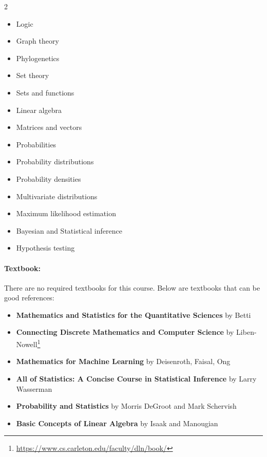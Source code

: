 \documentclass[12pt]{scrartcl}
\begin{document}
\begin{multicols}{2}
\begin{itemize}
\item Logic
\item Graph theory %
\item Phylogenetics %
\item Set theory %
\item Sets and functions
\item Linear algebra
\item Matrices and vectors
\item Probabilities
\item Probability distributions 
\item Probability densities
\item Multivariate distributions
\item Maximum likelihood estimation
\item Bayesian and Statistical inference
\item Hypothesis testing
\end{itemize}
\end{multicols}
\fi

\paragraph{Textbook:} 
There are no required textbooks for this course. Below are textbooks that can be good references: 
\begin{itemize}

\item \textbf{Mathematics and Statistics for the Quantitative Sciences} by Betti
\item \textbf{Connecting Discrete Mathematics and Computer Science} by Liben-Nowell\footnote{\url{https://www.cs.carleton.edu/faculty/dln/book/}}
\item \textbf{Mathematics for Machine Learning} by Deisenroth, Faisal, Ong
\item \textbf{All of Statistics: A Concise Course in Statistical Inference} by Larry Wasserman 
\item \textbf{Probability and Statistics} by Morris DeGroot and Mark Schervish
\item \textbf{Basic Concepts of Linear Algebra} by Isaak and Manougian
\end{itemize}
\clearpage
\end{document}
